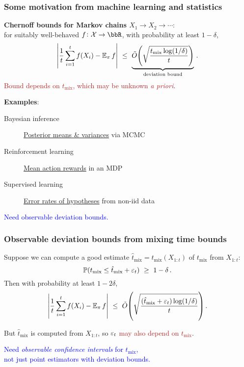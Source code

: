 \documentclass[11pt,compress,blue4]{beamer}
\newcommand{\BLUE}[1]{\textcolor{blue}{#1}}
\newcommand{\FIREBRICK}[1]{\textcolor{firebrick}{#1}}
\newcommand\tmix{\ensuremath{t_{\operatorname{mix}}}}
\newcommand\tmixhat{\ensuremath{\hat{t}_{\operatorname{mix}}}}
\newcommand\states{\ensuremath{\mathcal{X}}}
\begin{document}
\begin{frame}
  \frametitle{Some motivation from machine learning and statistics}

  \textbf{Chernoff bounds for Markov chains $X_1\to X_2\to\dotsb$}:
  \\
  for suitably well-behaved $f \colon \states \to \bbR$,
  with probability at least $1-\delta$,
  \[
    \Abs{
      \frac1t\sum_{i=1}^t f(X_i)
      -
      \E_\pi f
    }
    \ \leq \
    \underbrace{
      \tilde O\Parens{
        \sqrt{
          \frac{\tmix \log(1/\delta)}{t}
        }
      }
    }_{\text{deviation bound}}
    \,.
  \]
  \FIREBRICK{Bound depends on $\tmix$, which may be unknown \emph{a
  priori}}.

  \bigskip
  \textbf{Examples}:
  \begin{description}
    \item[Bayesian inference]
      \underline{Posterior means \& variances} via MCMC

    \item[Reinforcement learning]
      \underline{Mean action rewards} in an MDP

    \item[Supervised learning]
      \underline{Error rates of hypotheses} from non-iid data

  \end{description}

  \begin{center}
    \BLUE{%
      Need observable deviation bounds.
    }
  \end{center}

\end{frame}


\begin{frame}
  \frametitle{Observable deviation bounds from mixing time bounds}

  Suppose we can compute a good estimate $\tmixhat =
  \tmixhat(X_{1:t})$ of $\tmix$ from $X_{1:t}$:
  \[
    \P(\tmix \leq \tmixhat + \veps_t)
    \ \geq \
    1-\delta
    \,.
  \]
  Then with probability at least $1-2\delta$,
  \[
    \Abs{
      \frac1t\sum_{i=1}^t f(X_i)
      -
      \E_\pi f
    }
    \ \leq \
    \tilde O\Parens{
      \sqrt{
        \frac{\parens{\tmixhat + \veps_t} \log(1/\delta)}{t}
      }
    }
    \,.
  \]

  But $\tmixhat$ is computed from $X_{1:t}$, so
  \FIREBRICK{$\varepsilon_t$ may also depend on $\tmix$}.

  \begin{center}
    \BLUE{%
      Need \emph{observable confidence intervals} for $\tmix$, \\
      not just point estimators with deviation bounds.
    }
  \end{center}

\end{frame}
\end{document}
